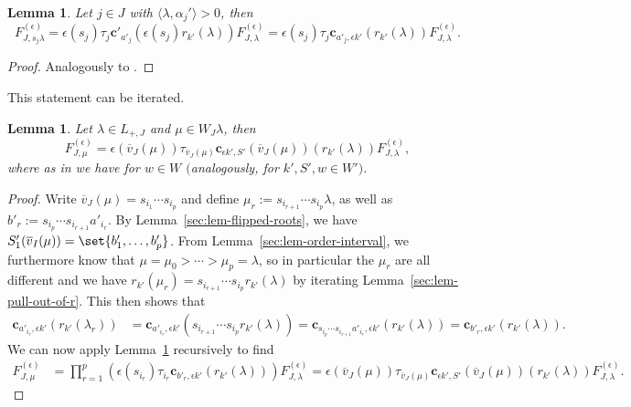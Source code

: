 \documentclass[pdftex]{sigma}
\newtheorem{Lemma}[Theorem]{Lemma}
\theoremstyle{definition}
\numberwithin{equation}{section}
\begin{document}
\begin{Lemma}\label{sec:lem-relation-within-orbit}
 Let $j\in J$ with $\langle \lambda, \alpha_j'\rangle>0$, then
 \[
 F^{(\epsilon)}_{J,s_j\lambda}
 = \epsilon(s_j) \tau_j \bm{c}'_{a'_j}(\epsilon(s_j)r_{k'}(\lambda))
 F^{(\epsilon)}_{J,\lambda}
 = \epsilon(s_j) \tau_j \bm{c}_{a'_j,\epsilon k'}(r_{k'}(\lambda))
 F^{(\epsilon)}_{J,\lambda}.
 \]
\end{Lemma}
\begin{proof}
 Analogously to \cite[Section~5.7.2]{macdonald}.
\end{proof}

This statement can be iterated.

\begin{Lemma}\label{sec:lem-relation-within-orbit-iterated}
 Let $\lambda\in L_{+,J}$ and $\mu\in W_J\lambda$, then
 \[
 F^{(\epsilon)}_{J,\mu}
 = \epsilon(\overline{v}_J(\mu))
 \tau_{\overline{v}_J(\mu)}
 \bm{c}_{\epsilon k', S'}(\overline{v}_J(\mu))(r_{k'}(\lambda))
 F^{(\epsilon)}_{J,\lambda},
 \]
 where as in {\rm \cite[equation~(4.4.6)]{macdonald}} we have
 for $w\in W$ $($analogously, for $k',S',w\in W')$.
\end{Lemma}
\begin{proof}
 Write $\overline{v}_J(\mu)=s_{i_1}\cdots s_{i_p}$ and define
$
 \mu_r := s_{i_{r+1}}\cdots s_{i_p} \lambda$,
 as well as $b'_r := s_{i_p}\cdots s_{i_{r+1}} a'_{i_r}$. By Lemma~\ref{sec:lem-flipped-roots}, we have
$
 S'_1(\overline{v}_I(\mu)) = \set{b'_1,\dots,b'_p}$.
 From Lemma~\ref{sec:lem-order-interval}, we furthermore know that
$
 \mu = \mu_0 > \cdots > \mu_p = \lambda$,
 so in particular the $\mu_r$ are all different and we have
$
 r_{k'}(\mu_r) = s_{i_{r+1}}\cdots s_{i_p} r_{k'}(\lambda)
$
 by iterating Lemma~\ref{sec:lem-pull-out-of-r}.
 This then shows that
 \begin{align*}
 \bm{c}_{a'_{i_r},\epsilon k'}(r_{k'}(\lambda_r))
 &= \bm{c}_{a'_{i_r}, \epsilon k'}(s_{i_{r+1}}\cdots s_{i_p} r_{k'}(\lambda))= \bm{c}_{s_{i_p}\cdots s_{i_{r+1}} a'_{i_r}, \epsilon k'}(r_{k'}(\lambda))= \bm{c}_{b'_r, \epsilon k'}(r_{k'}(\lambda)).
 \end{align*}
 We can now apply Lemma~\ref{sec:lem-relation-within-orbit} recursively
 to find
 \begin{align*}
 F^{(\epsilon)}_{J,\mu}
 &= \prod_{r=1}^p (\epsilon(s_{i_r}) \tau_{i_r} \bm{c}_{b'_r,\epsilon k'} (r_{k'}(\lambda)))
 F^{(\epsilon)}_{J,\lambda}= \epsilon(\overline{v}_J(\mu)) \tau_{\overline{v}_J(\mu)}
 \bm{c}_{\epsilon k', S'}(\overline{v}_J(\mu))(r_{k'}(\lambda))
 F^{(\epsilon)}_{J,\lambda}.\tag*{\qed}
 \end{align*}\renewcommand{\qed}{}
\end{proof}
\end{document}
